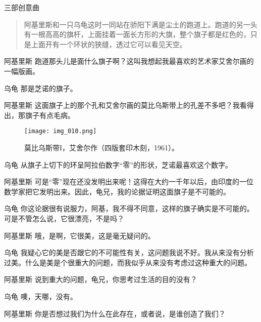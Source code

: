 
\begin{dialog}{三部创意曲}

\begin{quote}
阿基里斯和一只乌龟这时一同站在骄阳下满是尘土的跑道上。跑道的另一头有一根高高的旗杆，上面挂着一面长方形的大旗，整个旗子都是红色的，只是上面开有一个环状的狭缝，透过它可以看见天空。
\end{quote}

\begin{dialogue}

\item[阿基里斯]跑道那头儿是面什么旗子啊？这叫我想起我最喜欢的艺术家艾舍尔画的一幅版画。

\item[乌龟]那是芝诺的旗子。

\item[阿基里斯]这面旗子上的那个孔和艾舍尔画的莫比乌斯带上的孔差不多吧？我看得出，那旗子有点毛病。

\begin{figure}[!htb]
\texttt{[image: img\_010.png]}
\caption[莫比乌斯带I，艾舍尔作。]
  {莫比乌斯带I，艾舍尔作（四版套印木刻，1961）。}
\end{figure}

\item[乌龟]从旗子上切下的环呈阿拉伯数字“零”的形状，芝诺最喜欢这个数字。

\item[阿基里斯]可是“零”现在还没发明出来呢！这得在大约一千年以后，由印度的一位数学家把它发明出来。因此，龟兄，我的论据证明这面旗子是不可能的。

\item[乌龟]你这论据很有说服力，阿基，我不得不同意，这样的旗子确实是不可能的。可是不管怎么说，它很漂亮，不是吗？

\item[阿基里斯]哦，是啊，它很美，这是毫无疑问的。

\item[乌龟]我疑心它的美是否跟它的不可能性有关，这问题我说不好。我从来没有分析过美。什么是美是个很重大的问题，而我似乎从来没有考虑过这种重大的问题。

\item[阿基里斯]说到重大的问题，龟兄，你思考过生活的目的没有？

\item[乌龟]噢，天哪，没有。

\item[阿基里斯]你是否想过我们为什么在此存在，或者说，是谁创造了我们？


\end{dialogue}
\end{dialog}
